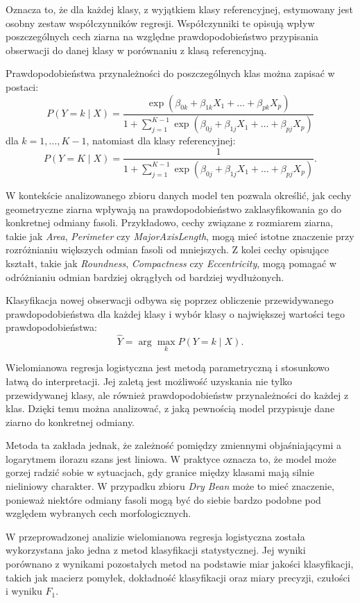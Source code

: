 \documentclass{report}
\begin{document}
Oznacza to, że dla każdej klasy, z wyjątkiem klasy referencyjnej, estymowany jest osobny zestaw współczynników regresji. Współczynniki te opisują wpływ poszczególnych cech ziarna na względne prawdopodobieństwo przypisania obserwacji do danej klasy w porównaniu z klasą referencyjną.

Prawdopodobieństwa przynależności do poszczególnych klas można zapisać w postaci:
\[
P(Y = k \mid X)
=
\frac{\exp(\beta_{0k} + \beta_{1k}X_1 + \ldots + \beta_{pk}X_p)}
{1 + \sum_{j=1}^{K-1} \exp(\beta_{0j} + \beta_{1j}X_1 + \ldots + \beta_{pj}X_p)}
\]
dla $k = 1, \ldots, K-1$, natomiast dla klasy referencyjnej:
\[
P(Y = K \mid X)
=
\frac{1}
{1 + \sum_{j=1}^{K-1} \exp(\beta_{0j} + \beta_{1j}X_1 + \ldots + \beta_{pj}X_p)}.
\]

W kontekście analizowanego zbioru danych model ten pozwala określić, jak cechy geometryczne ziarna wpływają na prawdopodobieństwo zaklasyfikowania go do konkretnej odmiany fasoli. Przykładowo, cechy związane z rozmiarem ziarna, takie jak \textit{Area}, \textit{Perimeter} czy \textit{MajorAxisLength}, mogą mieć istotne znaczenie przy rozróżnianiu większych odmian fasoli od mniejszych. Z kolei cechy opisujące kształt, takie jak \textit{Roundness}, \textit{Compactness} czy \textit{Eccentricity}, mogą pomagać w odróżnianiu odmian bardziej okrągłych od bardziej wydłużonych.

Klasyfikacja nowej obserwacji odbywa się poprzez obliczenie przewidywanego prawdopodobieństwa dla każdej klasy i wybór klasy o największej wartości tego prawdopodobieństwa:
\[
\hat{Y} = \arg\max_{k} P(Y = k \mid X).
\]

Wielomianowa regresja logistyczna jest metodą parametryczną i stosunkowo łatwą do interpretacji. Jej zaletą jest możliwość uzyskania nie tylko przewidywanej klasy, ale również prawdopodobieństw przynależności do każdej z klas. Dzięki temu można analizować, z jaką pewnością model przypisuje dane ziarno do konkretnej odmiany.

Metoda ta zakłada jednak, że zależność pomiędzy zmiennymi objaśniającymi a logarytmem ilorazu szans jest liniowa. W praktyce oznacza to, że model może gorzej radzić sobie w sytuacjach, gdy granice między klasami mają silnie nieliniowy charakter. W przypadku zbioru \textit{Dry Bean} może to mieć znaczenie, ponieważ niektóre odmiany fasoli mogą być do siebie bardzo podobne pod względem wybranych cech morfologicznych.

W przeprowadzonej analizie wielomianowa regresja logistyczna została wykorzystana jako jedna z metod klasyfikacji statystycznej. Jej wyniki porównano z wynikami pozostałych metod na podstawie miar jakości klasyfikacji, takich jak macierz pomyłek, dokładność klasyfikacji oraz miary precyzji, czułości i wyniku $F_1$.
\end{document}
